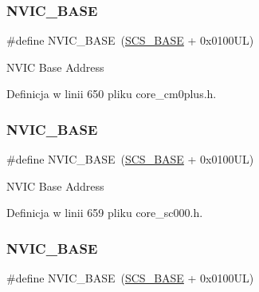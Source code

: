 \subsubsection{\texorpdfstring{N\+V\+I\+C\+\_\+\+B\+A\+SE}{NVIC\_BASE}\hspace{0.1cm}{\footnotesize\ttfamily [3/12]}}
{\footnotesize\ttfamily \#define N\+V\+I\+C\+\_\+\+B\+A\+SE~(\hyperlink{group___c_m_s_i_s__core__base_ga3c14ed93192c8d9143322bbf77ebf770}{S\+C\+S\+\_\+\+B\+A\+SE} +  0x0100\+U\+L)}

N\+V\+IC Base Address 

Definicja w linii 650 pliku core\+\_\+cm0plus.\+h.

\mbox{\label{group___c_m_s_i_s__core__base_gaa0288691785a5f868238e0468b39523d}} 
\subsubsection{\texorpdfstring{N\+V\+I\+C\+\_\+\+B\+A\+SE}{NVIC\_BASE}\hspace{0.1cm}{\footnotesize\ttfamily [4/12]}}
{\footnotesize\ttfamily \#define N\+V\+I\+C\+\_\+\+B\+A\+SE~(\hyperlink{group___c_m_s_i_s__core__base_ga3c14ed93192c8d9143322bbf77ebf770}{S\+C\+S\+\_\+\+B\+A\+SE} +  0x0100\+U\+L)}

N\+V\+IC Base Address 

Definicja w linii 659 pliku core\+\_\+sc000.\+h.

\mbox{\label{group___c_m_s_i_s__core__base_gaa0288691785a5f868238e0468b39523d}} 
\subsubsection{\texorpdfstring{N\+V\+I\+C\+\_\+\+B\+A\+SE}{NVIC\_BASE}\hspace{0.1cm}{\footnotesize\ttfamily [5/12]}}
{\footnotesize\ttfamily \#define N\+V\+I\+C\+\_\+\+B\+A\+SE~(\hyperlink{group___c_m_s_i_s__core__base_ga3c14ed93192c8d9143322bbf77ebf770}{S\+C\+S\+\_\+\+B\+A\+SE} +  0x0100\+U\+L)}

